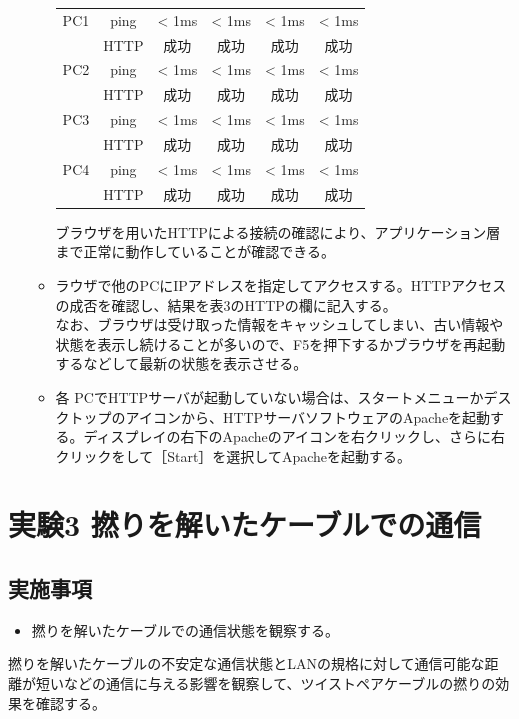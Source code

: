 \documentclass[10pt]{article}
\begin{document}
\begin{enumerate}
\begin{itemize}
\begin{table}[H]
\begin{tabular}{|c|c|c|c|c|c|}
        		\hline\hline
        	        PC1 & ping & < 1ms & < 1ms & < 1ms & < 1ms \\ 
        	        & HTTP & 成功 & 成功 & 成功 & 成功 \\ \hline
        	        PC2 & ping & < 1ms & < 1ms & < 1ms & < 1ms \\ 
        	        & HTTP & 成功 & 成功 & 成功 & 成功 \\ \hline
        	        PC3 & ping & < 1ms & < 1ms & < 1ms & < 1ms \\ 
        	        & HTTP & 成功 & 成功 & 成功 & 成功 \\ \hline
        	        PC4 & ping & < 1ms & < 1ms & < 1ms & < 1ms \\ 
        	        & HTTP & 成功 & 成功 & 成功 & 成功 \\ \hline
            
        	\end{tabular}
        \end{table} 
        \endgroup
        ブラウザを用いたHTTPによる接続の確認により、アプリケーション層まで正常に動作していることが確認できる。
        
        \item ラウザで他のPCにIPアドレスを指定してアクセスする。HTTPアクセスの成否を確認し、結果を表3のHTTPの欄に記入する。 \\ なお、ブラウザは受け取った情報をキャッシュしてしまい、古い情報や状態を表示し続けることが多いので、F5を押下するかブラウザを再起動するなどして最新の状態を表示させる。
        \item 各 PCでHTTPサーバが起動していない場合は、スタートメニューかデスクトップのアイコンから、HTTPサーバソフトウェアのApacheを起動する。ディスプレイの右下のApacheのアイコンを右クリックし、さらに右クリックをして［Start］を選択してApacheを起動する。
    \end{itemize}
\end{enumerate}

\pagebreak

\section{実験3 撚りを解いたケーブルでの通信}

\subsection{実施事項}

\begin{itemize}
    \item 撚りを解いたケーブルでの通信状態を観察する。
\end{itemize}
撚りを解いたケーブルの不安定な通信状態とLANの規格に対して通信可能な距離が短いなどの通信に与える影響を観察して、ツイストペアケーブルの撚りの効果を確認する。
\end{document}
